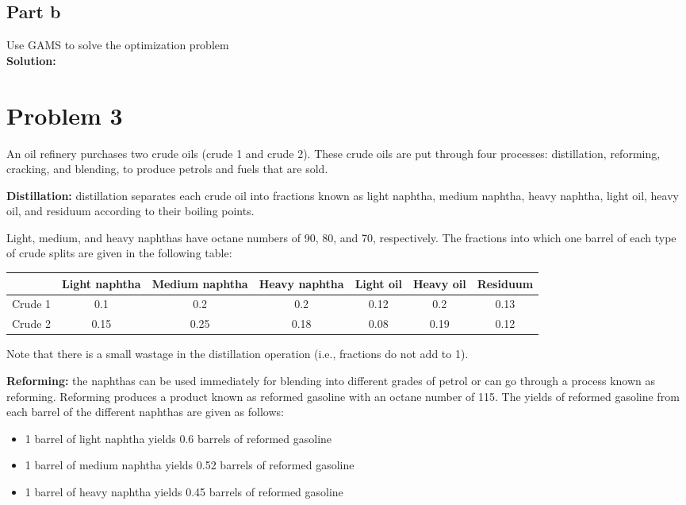 \documentclass[11pt]{article}
\begin{document}
\subsection{Part b}
Use GAMS to solve the optimization problem
\\
\textbf{Solution: }

\section{Problem 3}
An oil refinery purchases two crude oils (crude 1 and crude 2). These crude oils are put through four processes: distillation, reforming, cracking, and blending, to produce petrols and fuels that are sold.

\textbf{Distillation:} distillation separates each crude oil into fractions known as light naphtha, medium naphtha, heavy naphtha, light oil, heavy oil, and residuum according to their boiling points.

Light, medium, and heavy naphthas have octane numbers of 90, 80, and 70, respectively. The fractions into which one barrel of each type of crude splits are given in the following table:

\begin{tabular}{lcccccc}
    & Light naphtha & Medium naphtha & Heavy naphtha & Light oil & Heavy oil & Residuum \\
    \hline
    Crude 1 & 0.1 & 0.2 & 0.2 & 0.12 & 0.2 & 0.13 \\
    Crude 2 & 0.15 & 0.25 & 0.18 & 0.08 & 0.19 & 0.12 \\
\end{tabular}

Note that there is a small wastage in the distillation operation (i.e., fractions do not add to 1).

\textbf{Reforming:} the naphthas can be used immediately for blending into different grades of petrol or can go through a process known as reforming. Reforming produces a product known as reformed gasoline with an octane number of 115. The yields of reformed gasoline from each barrel of the different naphthas are given as follows:

\begin{itemize}
    \item 1 barrel of light naphtha yields 0.6 barrels of reformed gasoline
    \item 1 barrel of medium naphtha yields 0.52 barrels of reformed gasoline
    \item 1 barrel of heavy naphtha yields 0.45 barrels of reformed gasoline
\end{itemize}
\end{document}
